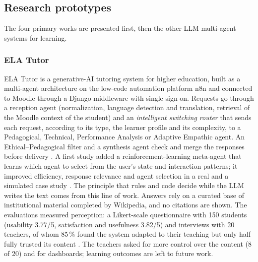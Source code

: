 \subsection{Research prototypes}
\label{subsec-prototypes}

The four primary works are presented first, then the other LLM multi-agent systems for learning.

\subsubsection{ELA Tutor}
ELA Tutor \cite{lopezgoyez2026ela,lopezgoyez2026exploratory} is a generative-AI tutoring system for higher education, built
as a multi-agent architecture on the low-code automation platform n8n and
connected to Moodle through a Django middleware with single sign-on.
Requests go through a reception agent (normalization, language detection
and translation, retrieval of the Moodle context of the student) and an
\emph{intelligent switching router} that sends each request, according to
its type, the learner profile and its complexity, to a Pedagogical,
Technical, Performance Analysis or Adaptive Empathic agent. An
Ethical--Pedagogical filter and a synthesis agent check and merge the
responses before delivery \cite{lopezgoyez2026exploratory}. A first study
added a reinforcement-learning meta-agent that learns which agent to select
from the user's state and interaction patterns; it improved efficiency,
response relevance and agent selection in a real and a simulated case
study \cite{lopezgoyez2026ela}. The principle that rules and code decide
while the LLM writes the text comes from this line of work. Answers rely
on a curated base of institutional material completed by Wikipedia, and
no citations are shown. The evaluations measured perception: a
Likert-scale questionnaire with 150 students (usability 3.77/5,
satisfaction and usefulness 3.82/5) \cite{lopezgoyez2026ela} and
interviews with 20 teachers, of whom 85\,\% found the system adapted to
their teaching but only half fully trusted its content
\cite{lopezgoyez2026exploratory}. The teachers asked for more control over
the content (8 of 20) and for dashboards; learning outcomes are left to
future work.

